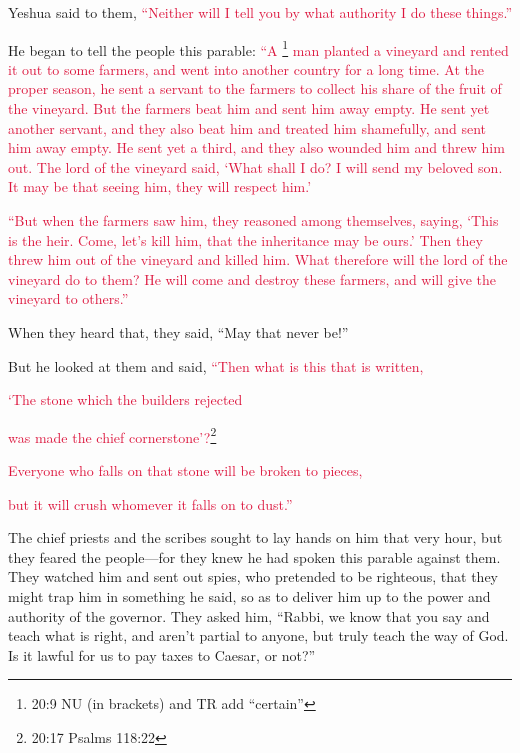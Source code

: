 \myverse{}Yeshua said to them,
\textcolor{crimson}{“Neither will I tell you by what authority I do these things.”}

\myverse{}He began to tell the people this parable:
\textcolor{crimson}{“A
}\footnote{20:9 NU (in brackets) and TR add “certain”}
\textcolor{crimson}{man planted a vineyard and rented it out to some farmers, and went into another country for a long
	time.
}
\myverse{}\textcolor{crimson}{At the proper season, he sent a servant to the farmers to collect his
	share of the fruit of the vineyard. But the farmers beat him and sent him away empty.
}
\myverse{}\textcolor{crimson}{He sent yet another servant, and they also beat him and treated him shamefully,
	and sent him away empty.
}
\myverse{}\textcolor{crimson}{He sent yet a third, and they also wounded him and threw him out.
}
\myverse{}\textcolor{crimson}{The lord of the vineyard said, ‘What shall I do? I will send my beloved
	son. It may be that seeing him, they will respect him.’}

\myverse{}\textcolor{crimson}{“But when the farmers saw him, they reasoned among themselves,
	saying, ‘This is the heir. Come, let’s kill him, that the inheritance may be ours.’
}
\myverse{}\textcolor{crimson}{Then they threw him out of the vineyard and killed him. What therefore
	will the lord of the vineyard do to them?
}
\myverse{}\textcolor{crimson}{He will come and destroy these farmers, and will give the vineyard to
	others.”}

When they heard that, they said, “May that never be!”

\myverse{}But he looked at them and said,
\textcolor{crimson}{“Then what is this that is written,}

\textcolor{crimson}{‘The stone which the builders rejected}

\textcolor{crimson}{was made the chief cornerstone’?}\footnote{ 20:17 Psalms 118:22
}

\myverse{}\textcolor{crimson}{Everyone who falls on that stone will be broken to pieces,
}

\textcolor{crimson}{but it will crush whomever it falls on to dust.”}

\myverse{}The chief priests and the scribes sought to lay hands on him
that very hour, but they feared the people—for they knew he had spoken this parable against them.
\myverse{}They watched him and sent out spies, who pretended to be righteous, that
they might trap him in something he said, so as to deliver him up to the power and authority of the governor.
\myverse{}They asked him, “Rabbi, we know that you say and teach what is right, and
aren’t partial to anyone, but truly teach the way of God.
\myverse{}Is it lawful for us to pay taxes to Caesar, or not?”

